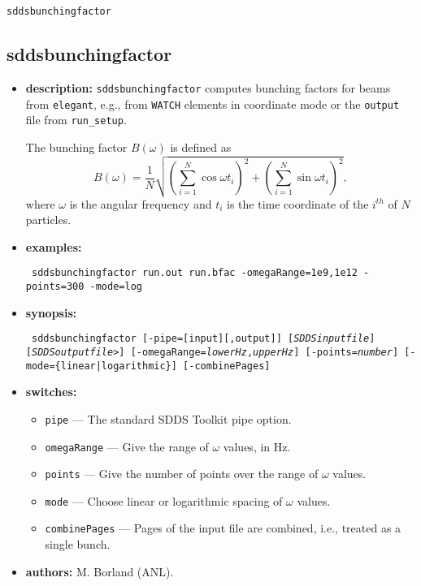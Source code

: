 \documentclass[11pt]{article}
\begin{document}
\newpage
\begin{center}{\Large\verb|sddsbunchingfactor|}\end{center}
\subsection{sddsbunchingfactor}

\begin{itemize}
\item {\bf description:} {\tt sddsbunchingfactor} computes bunching factors for 
beams from {\tt elegant}, e.g., from \verb|WATCH| elements in coordinate mode or
the \verb|output| file from \verb|run_setup|.

The bunching factor $B(\omega)$ is defined as
\begin{equation}
B(\omega) = \frac{1}{N}\sqrt{\left(\sum_{i=1}^N \cos \omega t_i\right)^2 + \left(\sum_{i=1}^N \sin\omega t_i\right)^2},
\end{equation}
where $\omega$ is the angular frequency and $t_i$ is the time coordinate of the $i^{th}$ of $N$ particles.

\item {\bf examples:}
\begin{flushleft}{\tt
sddsbunchingfactor run.out run.bfac -omegaRange=1e9,1e12 -points=300 -mode=log
}\end{flushleft}

\item {\bf synopsis:}
\begin{flushleft}{\tt
sddsbunchingfactor [-pipe=[input][,output]] [{\em SDDSinputfile}] [{\em SDDSoutputfile>}]
  [-omegaRange={\em lowerHz},{\em upperHz}] [-points={\em number}] [-mode=\{linear|logarithmic\}] 
  [-combinePages]
}\end{flushleft}

\item {\bf switches:}
\begin{itemize}
\item {\tt pipe} --- The standard SDDS Toolkit pipe option.
\item {\tt omegaRange} --- Give the range of $\omega$ values, in Hz.
\item {\tt points} --- Give the number of points over the range of $\omega$ values.
\item {\tt mode} --- Choose linear or logarithmic spacing of $\omega$ values.
\item {\tt combinePages} --- Pages of the input file are combined, i.e., treated as a single bunch.
\end{itemize}

\item {\bf authors:} M. Borland (ANL).
\end{itemize}
\end{document}
